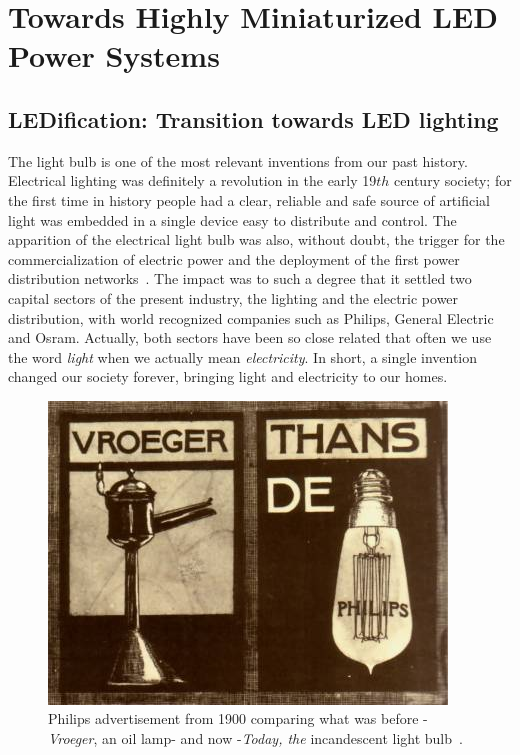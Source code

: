 \part{Towards Highly Miniaturized LED Power Systems }
\label{ch:twrd_HMLED}

\chapter[LEDification]{LEDification: Transition towards LED lighting }


The light bulb is one of the most relevant inventions from our past history. Electrical lighting was definitely a revolution in the early 19${th}$ century society; for the first time in history people had a clear, reliable and safe source of artificial light was embedded in a single device easy to distribute and control. The apparition  of the electrical light bulb was also, without doubt, the trigger for the commercialization of electric power and the deployment of the first power distribution networks~\cite{14NYISO}. The impact was to such a degree that it settled two capital sectors of the present industry, the lighting and the electric power distribution, with  world recognized companies such as Philips, General Electric and Osram.  Actually, both sectors have been so close related that often we use the word \emph{light} when we actually mean \emph{electricity}. In short, a single invention changed our society forever, bringing light and electricity to our homes.

\begin{figure}[!h]
\centering
\includegraphics{./0_intro/img/1900-philips3.jpg}
\caption[Philips lights advertisement from 1900]{Philips advertisement from 1900 comparing what was before -\emph{Vroeger}, an oil lamp- and now -\emph{Today, the} incandescent light bulb~\cite{lib:Philips}.}
\label{fig:incandescent_light_blub}
\end{figure}


